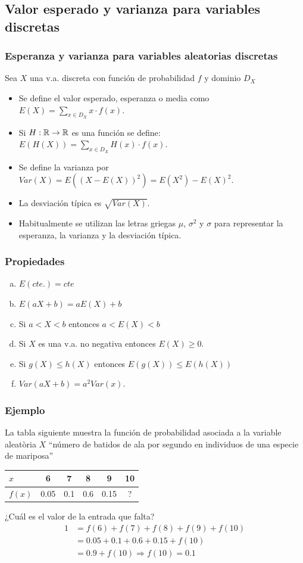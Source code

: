 \subsection{Valor esperado y varianza para variables discretas}
\begin{frame} 
\frametitle{Esperanza y varianza para variables aleatorias discretas}
Sea $X$ una v.a. discreta con función de probabilidad $f$ y dominio $D_X$
\begin{itemize} 
\item Se define el valor esperado, esperanza o media como 
$E(X)=\sum_{x\in D_X} x\cdot f(x)$.
\item Si $H:\mathbb{R}\to \mathbb{R}$ es una función se define:
$E(H(X))=\sum_{x\in D_X} H(x)\cdot f(x)$.
\item Se define la varianza por $Var(X)=E((X-E(X))^2)=E(X^2)-E(X)^2$.
\item La desviación típica es $\sqrt{Var(X)}$.
\item Habitualmente se utilizan las letras griegas $\mu$, $\sigma^2$  y $\sigma$ para representar la esperanza,  la varianza y la desviación típica.
\end{itemize}
\end{frame}

\begin{frame}
\frametitle{Propiedades}
\begin{enumerate}[a)]
\item $E(cte.)=cte$
 \item $E(a X+b)=a E(X)+b$
\item Si $a<X<b$ entonces $a<E(X)<b$
\item Si $X$ es una v.a. no negativa entonces $E(X)\geq 0$.
\item Si $g(X)\leq h(X)$ entonces $E(g(X))\leq E(h(X))$
\item $Var(a X+b)=a^2 Var(x)$.
\end{enumerate}
\end{frame}


\begin{frame}
\frametitle{Ejemplo}
La tabla siguiente muestra la función de probabilidad asociada a la variable aleatòria $X$ ``número de batidos de ala por segundo en individuos de una especie de mariposa''
\begin{center}
\begin{tabular}{l|ccccc}
$x$ & 6 & 7 & 8 & 9 & 10\\
\hline
$f(x)$ &  0.05 & 0.1 & 0.6 & 0.15 & ?
\end{tabular}
\end{center}

¿Cuál es el valor de la entrada que  falta?
$$
\begin{array}{rl}
1 & =f(6)+f(7)+f(8)+f(9)+f(10)\\ & =0.05+0.1+0.6+0.15+f(10)\\ & = 0.9+f(10)\Rightarrow f(10)=0.1
\end{array}
$$
\end{frame}

